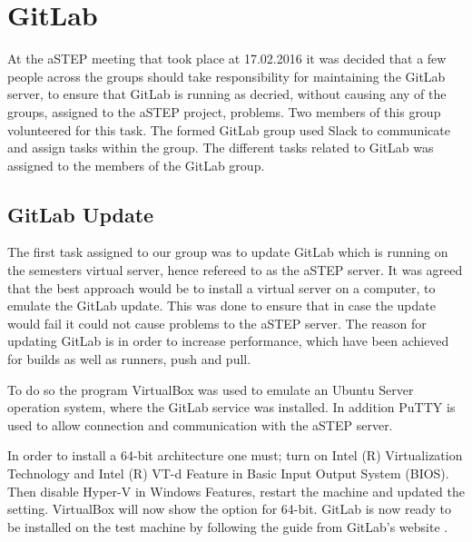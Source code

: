 \section{GitLab}
At the aSTEP meeting that took place at 17.02.2016 it was decided that a few people across the groups should take responsibility for maintaining the GitLab server, to ensure that GitLab is running as decried, without causing any of the groups, assigned to the aSTEP project, problems. Two members of this group volunteered for this task. 
The formed GitLab group used Slack to communicate and assign tasks within the group. The different tasks related to GitLab was assigned to the members of the GitLab group.

\subsection*{GitLab Update}
The first task assigned to our group was to update GitLab which is running on the semesters virtual server, hence refereed to as the aSTEP server. It was agreed that the best approach would be to install a virtual server on a computer, to emulate the GitLab update. This was done to ensure that in case the update would fail it could not cause problems to the aSTEP server.
The reason for updating GitLab is in order to increase performance, which have been achieved for builds as well as runners, push and pull. 

To do so the program VirtualBox \cite{vbox} was used to emulate an Ubuntu Server operation system, where the GitLab service was installed. In addition PuTTY \cite{putty} is used to allow connection and communication with the aSTEP server.

In order to install a 64-bit architecture one must; turn on Intel (R) Virtualization Technology and Intel (R) VT-d Feature in Basic Input Output System (BIOS). Then disable Hyper-V in Windows Features, restart the machine and updated the setting. VirtualBox will now show the option for 64-bit. 
GitLab is now ready to be installed on the test machine by following the guide from GitLab's website \cite{gitlab_guide}.


